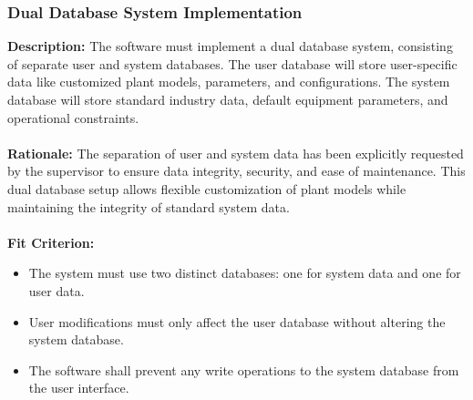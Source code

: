 \documentclass[12pt]{article}
\begin{document}
\subsubsection{Dual Database System Implementation}
\textbf{Description:} The software must implement a dual database system, consisting of separate user and system databases. The user database will store user-specific data like customized plant models, parameters, and configurations. The system database will store standard industry data, default equipment parameters, and operational constraints.\\\\
\textbf{Rationale:} The separation of user and system data has been explicitly requested by the supervisor to ensure data integrity, security, and ease of maintenance. This dual database setup allows flexible customization of plant models while maintaining the integrity of standard system data.\\\\
\textbf{Fit Criterion:} 
\begin{itemize}
  \item The system must use two distinct databases: one for system data and one for user data.
  \item User modifications must only affect the user database without altering the system database.
  \item The software shall prevent any write operations to the system database from the user interface.
\end{itemize}
\end{document}

